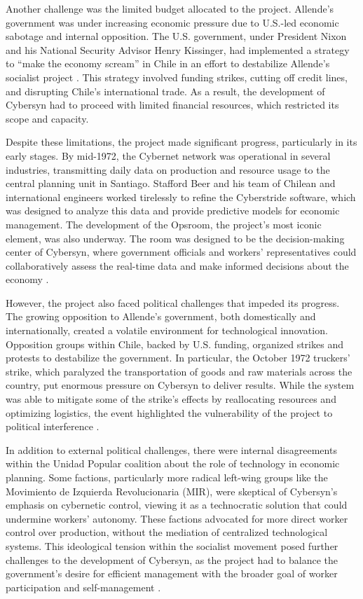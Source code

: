 \begin{refsection}
Another challenge was the limited budget allocated to the project. Allende's government was under increasing economic pressure due to U.S.-led economic sabotage and internal opposition. The U.S. government, under President Nixon and his National Security Advisor Henry Kissinger, had implemented a strategy to “make the economy scream” in Chile in an effort to destabilize Allende’s socialist project \cite[pp.~241-245]{kornbluh2016}. This strategy involved funding strikes, cutting off credit lines, and disrupting Chile’s international trade. As a result, the development of Cybersyn had to proceed with limited financial resources, which restricted its scope and capacity. 

Despite these limitations, the project made significant progress, particularly in its early stages. By mid-1972, the Cybernet network was operational in several industries, transmitting daily data on production and resource usage to the central planning unit in Santiago. Stafford Beer and his team of Chilean and international engineers worked tirelessly to refine the Cyberstride software, which was designed to analyze this data and provide predictive models for economic management. The development of the Opsroom, the project's most iconic element, was also underway. The room was designed to be the decision-making center of Cybersyn, where government officials and workers' representatives could collaboratively assess the real-time data and make informed decisions about the economy \cite[pp.~149-153]{medina2014}.

However, the project also faced political challenges that impeded its progress. The growing opposition to Allende’s government, both domestically and internationally, created a volatile environment for technological innovation. Opposition groups within Chile, backed by U.S. funding, organized strikes and protests to destabilize the government. In particular, the October 1972 truckers' strike, which paralyzed the transportation of goods and raw materials across the country, put enormous pressure on Cybersyn to deliver results. While the system was able to mitigate some of the strike's effects by reallocating resources and optimizing logistics, the event highlighted the vulnerability of the project to political interference \cite[pp.~239-241]{harmer2011}.

In addition to external political challenges, there were internal disagreements within the Unidad Popular coalition about the role of technology in economic planning. Some factions, particularly more radical left-wing groups like the Movimiento de Izquierda Revolucionaria (MIR), were skeptical of Cybersyn's emphasis on cybernetic control, viewing it as a technocratic solution that could undermine workers’ autonomy. These factions advocated for more direct worker control over production, without the mediation of centralized technological systems. This ideological tension within the socialist movement posed further challenges to the development of Cybersyn, as the project had to balance the government’s desire for efficient management with the broader goal of worker participation and self-management \cite[pp.~127-130]{medina2011}.


\end{refsection}
